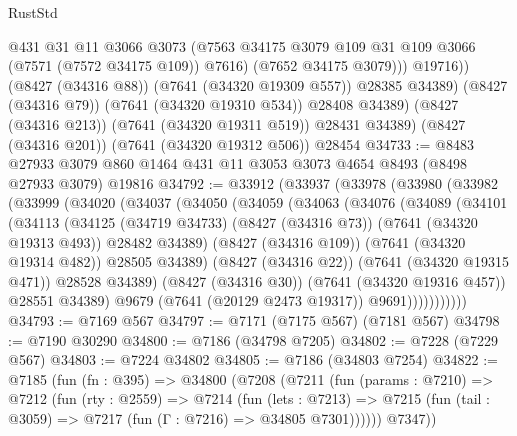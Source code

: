 \begin{lexlean}{RustStd}
\begin{coremodule}
                  @431
                  @31
                  @11
                  @3066
                  @3073
                  (@7563 @34175 @3079 @109 @31 @109 @3066 (@7571 (@7572 @34175 @109)) @7616)
                  (@7652 @34175 @3079)))
              @19716))
          (@8427 (@34316 @88))
          (@7641 (@34320 @19309 @557))
          @28385
          @34389)
        (@8427 (@34316 @79))
        (@7641 (@34320 @19310 @534))
        @28408
        @34389)
      (@8427 (@34316 @213))
      (@7641 (@34320 @19311 @519))
      @28431
      @34389)
    (@8427 (@34316 @201))
    (@7641 (@34320 @19312 @506))
    @28454
@34733 := @8483 @27933 @3079 @860 @1464 @431 @11 @3053 @3073 @4654 @8493 (@8498 @27933 @3079) @19816
@34792 := @33912
    (@33937
      (@33978
        (@33980
          (@33982
            (@33999
              (@34020
                (@34037
                  (@34050
                    (@34059
                      (@34063
                        (@34076
                          (@34089
                            (@34101
                              (@34113
                                (@34125
                                  (@34719 @34733)
                                  (@8427 (@34316 @73))
                                  (@7641 (@34320 @19313 @493))
                                  @28482
                                  @34389)
                                (@8427 (@34316 @109))
                                (@7641 (@34320 @19314 @482))
                                @28505
                                @34389)
                              (@8427 (@34316 @22))
                              (@7641 (@34320 @19315 @471))
                              @28528
                              @34389)
                            (@8427 (@34316 @30))
                            (@7641 (@34320 @19316 @457))
                            @28551
                            @34389)
                          @9679
                          (@7641 (@20129 @2473 @19317))
                          @9691)))))))))))
@34793 := @7169 @567
@34797 := @7171 (@7175 @567) (@7181 @567)
@34798 := @7190 @30290
@34800 := @7186 (@34798 @7205)
@34802 := @7228 (@7229 @567)
@34803 := @7224 @34802
@34805 := @7186 (@34803 @7254)
@34822 := @7185
    (fun (fn : @395) =>
    @34800
      (@7208
        (@7211
          (fun (params : @7210) =>
          @7212
            (fun (rty : @2559) =>
            @7214
              (fun (lets : @7213) =>
              @7215 (fun (tail : @3059) => @7217 (fun (Γ : @7216) => @34805 @7301))))))
        @7347))

\end{coremodule}
\end{lexlean}
